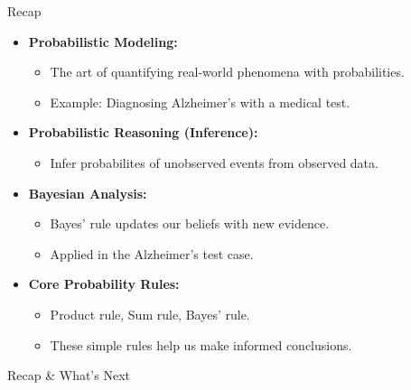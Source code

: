 \documentclass{beamer}
\begin{document}
\begin{frame}{Recap}
  \begin{itemize}
    \item \textbf{Probabilistic Modeling:}
    \begin{itemize}
      \item The art of quantifying real-world phenomena with probabilities.
      \item Example: Diagnosing Alzheimer’s with a medical test.
    \end{itemize}

    \item \textbf{Probabilistic Reasoning (Inference):}
    \begin{itemize}
    \item Infer probabilites of unobserved events from observed data.
    \end{itemize}

    \item \textbf{Bayesian Analysis:}
      \begin{itemize}
      \item Bayes' rule updates our beliefs with new evidence.
      \item Applied in the Alzheimer’s test case.
    \end{itemize}

    \item \textbf{Core Probability Rules:}
    \begin{itemize}
      \item Product rule, Sum rule, Bayes' rule.
      \item These simple rules help us make informed conclusions.
    \end{itemize}
  \end{itemize}
\end{frame}

\begin{frame}{Recap \& What's Next}
\end{frame}
\end{document}
